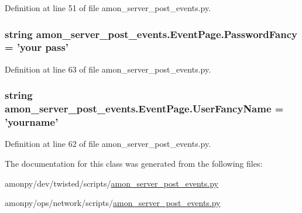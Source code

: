 Definition at line 51 of file amon\-\_\-server\-\_\-post\-\_\-events.\-py.

\hypertarget{classamon__server__post__events_1_1_event_page_a6cedf6892b5526dd3d44c0d859ff1d05}{
\subsubsection[{Password\-Fancy}]{\setlength{\rightskip}{0pt plus 5cm}string amon\-\_\-server\-\_\-post\-\_\-events.\-Event\-Page.\-Password\-Fancy = 'your pass'\hspace{0.3cm}{\ttfamily [static]}}}\label{classamon__server__post__events_1_1_event_page_a6cedf6892b5526dd3d44c0d859ff1d05}


Definition at line 63 of file amon\-\_\-server\-\_\-post\-\_\-events.\-py.

\hypertarget{classamon__server__post__events_1_1_event_page_adbabe10502f40f6fb8562017ca3b332a}{
\subsubsection[{User\-Fancy\-Name}]{\setlength{\rightskip}{0pt plus 5cm}string amon\-\_\-server\-\_\-post\-\_\-events.\-Event\-Page.\-User\-Fancy\-Name = 'yourname'\hspace{0.3cm}{\ttfamily [static]}}}\label{classamon__server__post__events_1_1_event_page_adbabe10502f40f6fb8562017ca3b332a}


Definition at line 62 of file amon\-\_\-server\-\_\-post\-\_\-events.\-py.



The documentation for this class was generated from the following files\-:\begin{DoxyCompactItemize}
\item 
amonpy/dev/twisted/scripts/\hyperlink{dev_2twisted_2scripts_2amon__server__post__events_8py}{amon\-\_\-server\-\_\-post\-\_\-events.\-py}\item 
amonpy/ops/network/scripts/\hyperlink{ops_2network_2scripts_2amon__server__post__events_8py}{amon\-\_\-server\-\_\-post\-\_\-events.\-py}\end{DoxyCompactItemize}
